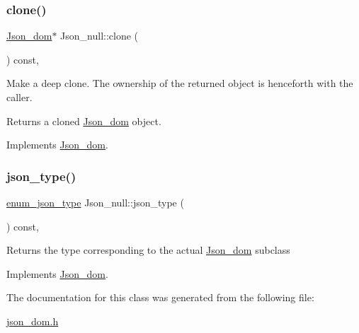 \subsubsection{\texorpdfstring{clone()}{clone()}}
{\footnotesize\ttfamily \mbox{\hyperlink{classJson__dom}{Json\+\_\+dom}}$\ast$ Json\+\_\+null\+::clone (\begin{DoxyParamCaption}{ }\end{DoxyParamCaption}) const\hspace{0.3cm}{\ttfamily [inline]}, {\ttfamily [virtual]}}

Make a deep clone. The ownership of the returned object is henceforth with the caller.

\begin{DoxyReturn}{Returns}
a cloned \mbox{\hyperlink{classJson__dom}{Json\+\_\+dom}} object. 
\end{DoxyReturn}


Implements \mbox{\hyperlink{classJson__dom_a03c529d590cc4cdb747ccb82f4b70fb5}{Json\+\_\+dom}}.

\mbox{\label{classJson__null_a84d38b413a4894f8d8b214cdbb692974}} 
\subsubsection{\texorpdfstring{json\+\_\+type()}{json\_type()}}
{\footnotesize\ttfamily \mbox{\hyperlink{classJson__dom_af37eed7dfe1da1d6507d3ab85320eb03}{enum\+\_\+json\+\_\+type}} Json\+\_\+null\+::json\+\_\+type (\begin{DoxyParamCaption}{ }\end{DoxyParamCaption}) const\hspace{0.3cm}{\ttfamily [inline]}, {\ttfamily [virtual]}}

\begin{DoxyReturn}{Returns}
the type corresponding to the actual \mbox{\hyperlink{classJson__dom}{Json\+\_\+dom}} subclass 
\end{DoxyReturn}


Implements \mbox{\hyperlink{classJson__dom_aed953eca1e112aade66511ad1bbf82b8}{Json\+\_\+dom}}.



The documentation for this class was generated from the following file\+:\begin{DoxyCompactItemize}
\item 
\mbox{\hyperlink{json__dom_8h}{json\+\_\+dom.\+h}}\end{DoxyCompactItemize}
